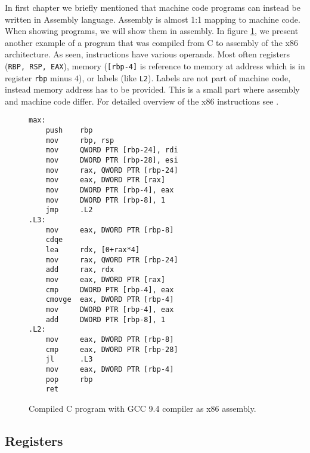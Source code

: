 In first chapter we briefly mentioned that machine code programs can instead be written in Assembly language.
Assembly is almost 1:1 mapping to machine code. When showing programs, we will show them in assembly.
In figure \ref{fig:assembly-example2}, we present another example of a program that was compiled from C
to assembly of the x86 architecture.
As seen, instructions have various operands. Most often registers (\texttt{RBP, RSP, EAX}), memory (\texttt{[rbp-4]} is reference to memory at address which
is in register \texttt{rbp} minus $4$), or labels (like \texttt{L2}). Labels are not part of machine code, instead
memory address has to be provided. This is a small part where assembly and machine code differ.
For detailed overview of the x86 instructions see \cite{intel-manual}.

\begin{figure}\label{fig:assembly-example2}
    \begin{lstlisting}
max:
    push    rbp
    mov     rbp, rsp
    mov     QWORD PTR [rbp-24], rdi
    mov     DWORD PTR [rbp-28], esi
    mov     rax, QWORD PTR [rbp-24]
    mov     eax, DWORD PTR [rax]
    mov     DWORD PTR [rbp-4], eax
    mov     DWORD PTR [rbp-8], 1
    jmp     .L2
.L3:
    mov     eax, DWORD PTR [rbp-8]
    cdqe
    lea     rdx, [0+rax*4]
    mov     rax, QWORD PTR [rbp-24]
    add     rax, rdx
    mov     eax, DWORD PTR [rax]
    cmp     DWORD PTR [rbp-4], eax
    cmovge  eax, DWORD PTR [rbp-4]
    mov     DWORD PTR [rbp-4], eax
    add     DWORD PTR [rbp-8], 1
.L2:
    mov     eax, DWORD PTR [rbp-8]
    cmp     eax, DWORD PTR [rbp-28]
    jl      .L3
    mov     eax, DWORD PTR [rbp-4]
    pop     rbp
    ret
    \end{lstlisting}
    \caption{Compiled C program with GCC 9.4 compiler as x86 assembly.}
\end{figure}

\subsection{Registers}

